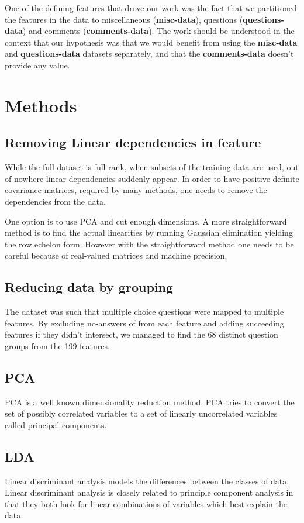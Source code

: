 \documentclass[a4paper,10pt]{article}
\begin{document}
One of the defining features that drove our work was the fact that we partitioned the features in the data to miscellaneous ({\bf misc-data}), questions ({\bf questions-data}) and comments ({\bf comments-data}). The work should be understood in the context that our hypothesis was that we would benefit from using the {\bf misc-data} and {\bf questions-data} datasets separately, and that the {\bf comments-data} doesn’t provide any value.

\section{Methods}
\subsection{Removing Linear dependencies in feature}
While the full dataset is full-rank, when subsets of the training data are used, out of nowhere linear dependencies suddenly appear. In order to have positive definite covariance matrices, required by many methods, one needs to remove the dependencies from the data.

One option is to use PCA and cut enough dimensions. A more straightforward method is to find the actual linearities by running Gaussian elimination yielding the row echelon form. However with the straightforward method one needs to be careful because of real-valued matrices and machine precision.

\subsection{Reducing data by grouping}
The dataset was such that multiple choice questions were mapped to multiple features. By excluding no-answers of from each feature and adding succeeding features if they didn’t intersect, we managed to find the 68 distinct question groups from the 199 features.

\subsection{PCA}
PCA is a well known dimensionality reduction method. PCA tries to convert the set of possibly correlated variables to a set of linearly uncorrelated variables called principal components.

\subsection{LDA}
Linear discriminant analysis models the differences between the classes of data. Linear discriminant analysis is closely related to principle component analysis in that they both look for linear combinations of variables which best explain the data.
\end{document}
